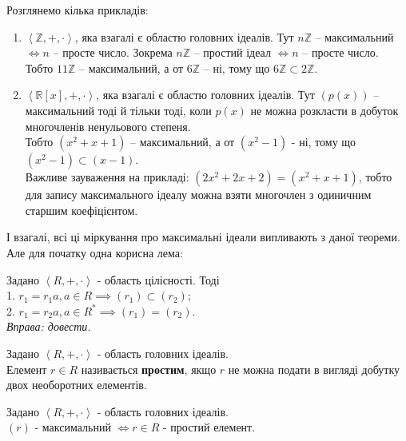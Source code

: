 \documentclass{math_library}
\begin{document}
\begin{example}
Розглянемо кілька прикладів:
\begin{enumerate}[wide=0pt,label={\arabic*.}]
\item $\left<\mathbb{Z},+,\cdot \right>$, яка взагалі є областю головних ідеалів. Тут $n \mathbb{Z}$ -- максимальний $\iff n$ -- просте число. Зокрема $n\mathbb{Z}$ -- простий ідеал $\iff n$ -- просте число.\\
Тобто $11 \mathbb{Z}$ -- максимальний, а от $6 \mathbb{Z}$ -- ні, тому що $6 \mathbb{Z} \subset 2 \mathbb{Z}$.

\item $\left< \mathbb{R}[x], +,\cdot \right>$, яка взагалі є областю головних ідеалів. Тут $(p(x))$ -- максимальний тоді й тільки тоді, коли $p(x)$ не можна розкласти в добуток многочленів ненульового степеня.\\
Тобто $(x^2+x+1)$ -- максимальний, а от $(x^2-1)$ - ні, тому що $(x^2-1) \subset (x-1)$.\\
Важливе зауваження на прикладі: $(2x^2+2x+2) = (x^2+x+1)$, тобто для запису максимального ідеалу можна взяти многочлен з одиничним старшим коефіцієнтом.
\end{enumerate}
\end{example}

\iffalse
І взагалі, всі ці міркування про максимальні ідеали випливають з даної теореми. Але для початку одна корисна лема:

\begin{lemma}
Задано $\left<R,+,\cdot \right>$ - область цілісності. Тоді\\
1. $r_1 = r_1a, a \in R \implies (r_1) \subset (r_2)$;\\
2. $r_1 = r_2a, a \in R^* \implies (r_1) = (r_2)$.\\
\textit{Вправа: довести.}
\end{lemma}

\begin{definition}
Задано $\left<R,+,\cdot \right>$ - область головних ідеалів.\\
Елемент $r \in R$ називається \textbf{простим}, якщо $r$ не можна подати в вигляді добутку двох необоротних елементів.
\end{definition}

\begin{theorem}
Задано $\left<R,+,\cdot \right>$ - область головних ідеалів.\\
$(r)$ - максимальний $\iff r \in R$ - простий елемент.
\end{theorem}
\end{document}

